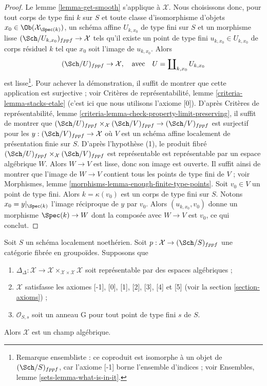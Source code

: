 \begin{proof}
Le lemme \ref{lemma-get-smooth} s'applique à $\mathcal{X}$. Nous choisissons
donc, pour tout corps de type fini $k$ sur $S$ et toute classe d'isomorphisme
d'objets $x_0 \in \Ob(\mathcal{X}_{\Spec(k)})$, un schéma affine
$U_{k, x_0}$ de type fini sur $S$ et un morphisme lisse
$(\Sch/U_{k, x_0})_{fppf} \to \mathcal{X}$ tels qu'il existe un point de type
fini $u_{k, x_0} \in U_{k, x_0}$ de corps résiduel $k$ tel que $x_0$ soit
l'image de $u_{k, x_0}$. Alors
$$
(\Sch/U)_{fppf} \to \mathcal{X},
\quad\text{avec}\quad
U = \coprod\nolimits_{k, x_0} U_{k, x_0}
$$
est lisse\footnote{Remarque ensembliste : ce coproduit est isomorphe à un
objet de $(\Sch/S)_{fppf}$, car l'axiome [-1] borne l'ensemble d'indices ;
voir Ensembles, lemme \ref{sets-lemma-what-is-in-it}.}. Pour achever la
démonstration, il suffit de montrer que cette application est surjective ;
voir Critères de représentabilité, lemme \ref{criteria-lemma-stacks-etale}
(c'est ici que nous utilisons l'axiome [0]). D'après Critères de
représentabilité, lemme
\ref{criteria-lemma-check-property-limit-preserving}, il suffit de montrer que
$(\Sch/U)_{fppf} \times_\mathcal{X} (\Sch/V)_{fppf} \to (\Sch/V)_{fppf}$
est surjectif pour les $y : (\Sch/V)_{fppf} \to \mathcal{X}$ où $V$ est un
schéma affine localement de présentation finie sur $S$. D'après l'hypothèse
(1), le produit fibré
$(\Sch/U)_{fppf} \times_\mathcal{X} (\Sch/V)_{fppf}$ est représentable
est représentable par un espace algébrique $W$. Alors $W \to V$ est lisse,
donc son image est ouverte. Il suffit ainsi de montrer que l'image de
$W \to V$ contient tous les points de type fini de $V$ ; voir Morphismes,
lemme \ref{morphisms-lemma-enough-finite-type-points}. Soit $v_0 \in V$ un
point de type fini. Alors $k = \kappa(v_0)$ est un corps de type fini sur $S$.
Notons $x_0 = y|_{\Spec(k)}$ l'image réciproque de $y$ par $v_0$. Alors
$(u_{k, x_0}, v_0)$ donne un morphisme $\Spec(k) \to W$ dont la composée avec
$W \to V$ est $v_0$, ce qui conclut.
\end{proof}

\begin{proposition}
\label{proposition-second-diagonal-representable}
Soit $S$ un schéma localement noethérien. Soit
$p : \mathcal{X} \to (\Sch/S)_{fppf}$ une catégorie fibrée en groupoïdes.
Supposons que
\begin{enumerate}
\item $\Delta_\Delta : \mathcal{X} \to
\mathcal{X} \times_{\mathcal{X} \times \mathcal{X}} \mathcal{X}$
soit représentable par des espaces algébriques ;
\item $\mathcal{X}$ satisfasse les axiomes [-1], [0], [1], [2], [3], [4] et
[5] (voir la section \ref{section-axioms}) ;
\item $\mathcal{O}_{S, s}$ soit un anneau G pour tout point de type fini $s$
de $S$.
\end{enumerate}
Alors $\mathcal{X}$ est un champ algébrique.
\end{proposition}

